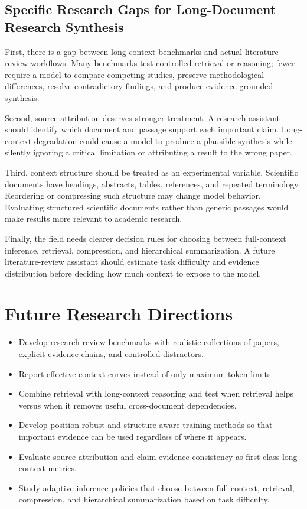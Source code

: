 \documentclass[manuscript,screen,oneside]{acmart}
\begin{document}
\subsection{Specific Research Gaps for Long-Document Research Synthesis}\label{sec:specific-gaps}
First, there is a gap between long-context benchmarks and actual literature-review workflows. Many benchmarks test controlled retrieval or reasoning; fewer require a model to compare competing studies, preserve methodological differences, resolve contradictory findings, and produce evidence-grounded synthesis.

Second, source attribution deserves stronger treatment. A research assistant should identify which document and passage support each important claim. Long-context degradation could cause a model to produce a plausible synthesis while silently ignoring a critical limitation or attributing a result to the wrong paper.

Third, context structure should be treated as an experimental variable. Scientific documents have headings, abstracts, tables, references, and repeated terminology. Reordering or compressing such structure may change model behavior. Evaluating structured scientific documents rather than generic passages would make results more relevant to academic research.

Finally, the field needs clearer decision rules for choosing between full-context inference, retrieval, compression, and hierarchical summarization. A future literature-review assistant should estimate task difficulty and evidence distribution before deciding how much context to expose to the model.

\section{Future Research Directions}\label{sec:future}
\begin{itemize}
\item Develop research-review benchmarks with realistic collections of papers, explicit evidence chains, and controlled distractors.
\item Report effective-context curves instead of only maximum token limits.
\item Combine retrieval with long-context reasoning and test when retrieval helps versus when it removes useful cross-document dependencies.
\item Develop position-robust and structure-aware training methods so that important evidence can be used regardless of where it appears.
\item Evaluate source attribution and claim-evidence consistency as first-class long-context metrics.
\item Study adaptive inference policies that choose between full context, retrieval, compression, and hierarchical summarization based on task difficulty.
\end{itemize}
\end{document}
